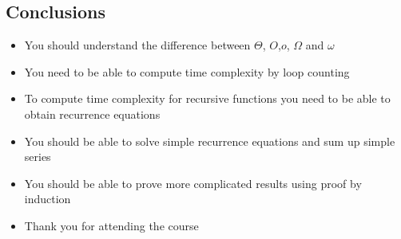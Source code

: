 \begin{slide}
\section{Conclusions}

\begin{PauseHighLight}
  \begin{itemize}
  \item You should understand the difference between $\Theta$, $O$,$o$,
    $\Omega$ and $\omega$\pause
  \item You need to be able to compute time complexity by loop
    counting\pause
  \item To compute time complexity for recursive functions you need to
    be able to obtain recurrence equations\pause
  \item You should be able to solve simple recurrence equations and sum
    up simple series\pause
  \item You should be able to prove more complicated results using proof
    by induction\pause
  \item Thank you for attending the course\pauseb
  \end{itemize}
\end{PauseHighLight}

\end{slide}
